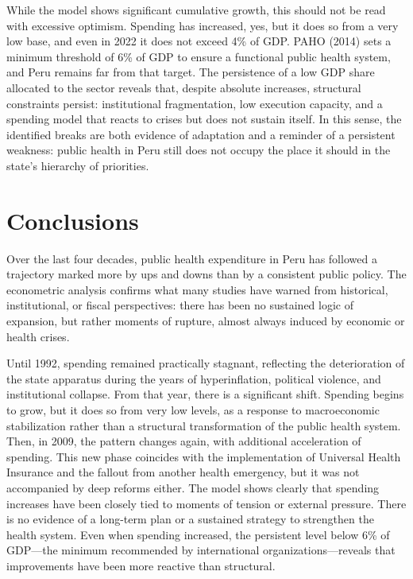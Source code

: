 \documentclass[12pt]{article}
\begin{document}
While the model shows significant cumulative growth, this should not be read with excessive optimism. Spending has increased, yes, but it does so from a very low base, and even in 2022 it does not exceed 4\% of GDP. PAHO (2014) sets a minimum threshold of 6\% of GDP to ensure a functional public health system, and Peru remains far from that target. The persistence of a low GDP share allocated to the sector reveals that, despite absolute increases, structural constraints persist: institutional fragmentation, low execution capacity, and a spending model that reacts to crises but does not sustain itself. In this sense, the identified breaks are both evidence of adaptation and a reminder of a persistent weakness: public health in Peru still does not occupy the place it should in the state’s hierarchy of priorities.

\section{Conclusions}

Over the last four decades, public health expenditure in Peru has followed a trajectory marked more by ups and downs than by a consistent public policy. The econometric analysis confirms what many studies have warned from historical, institutional, or fiscal perspectives: there has been no sustained logic of expansion, but rather moments of rupture, almost always induced by economic or health crises.

Until 1992, spending remained practically stagnant, reflecting the deterioration of the state apparatus during the years of hyperinflation, political violence, and institutional collapse. From that year, there is a significant shift. Spending begins to grow, but it does so from very low levels, as a response to macroeconomic stabilization rather than a structural transformation of the public health system. Then, in 2009, the pattern changes again, with additional acceleration of spending. This new phase coincides with the implementation of Universal Health Insurance and the fallout from another health emergency, but it was not accompanied by deep reforms either. The model shows clearly that spending increases have been closely tied to moments of tension or external pressure. There is no evidence of a long-term plan or a sustained strategy to strengthen the health system. Even when spending increased, the persistent level below 6\% of GDP—the minimum recommended by international organizations—reveals that improvements have been more reactive than structural.
\end{document}
